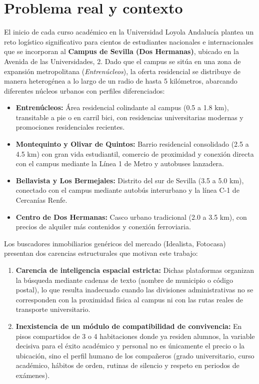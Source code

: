 \documentclass[a4paper,12pt]{article}
\begin{document}
\section{Problema real y contexto}

El inicio de cada curso académico en la Universidad Loyola Andalucía plantea un reto logístico significativo para cientos de estudiantes nacionales e internacionales que se incorporan al \textbf{Campus de Sevilla (Dos Hermanas)}, ubicado en la Avenida de las Universidades, 2. Dado que el campus se sitúa en una zona de expansión metropolitana (\textit{Entrenúcleos}), la oferta residencial se distribuye de manera heterogénea a lo largo de un radio de hasta 5 kilómetros, abarcando diferentes núcleos urbanos con perfiles diferenciados:

\begin{itemize}[leftmargin=1.0cm]
  \item \textbf{Entrenúcleos:} Área residencial colindante al campus (0.5 a 1.8 km), transitable a pie o en carril bici, con residencias universitarias modernas y promociones residenciales recientes.
  \item \textbf{Montequinto y Olivar de Quintos:} Barrio residencial consolidado (2.5 a 4.5 km) con gran vida estudiantil, comercio de proximidad y conexión directa con el campus mediante la Línea 1 de Metro y autobuses lanzadera.
  \item \textbf{Bellavista y Los Bermejales:} Distrito del sur de Sevilla (3.5 a 5.0 km), conectado con el campus mediante autobús interurbano y la línea C-1 de Cercanías Renfe.
  \item \textbf{Centro de Dos Hermanas:} Casco urbano tradicional (2.0 a 3.5 km), con precios de alquiler más contenidos y conexión ferroviaria.
\end{itemize}

Los buscadores inmobiliarios genéricos del mercado (Idealista, Fotocasa) presentan dos carencias estructurales que motivan este trabajo:
\begin{enumerate}[leftmargin=1.0cm]
  \item \textbf{Carencia de inteligencia espacial estricta:} Dichas plataformas organizan la búsqueda mediante cadenas de texto (nombre de municipio o código postal), lo que resulta inadecuado cuando las divisiones administrativas no se corresponden con la proximidad física al campus ni con las rutas reales de transporte universitario.
  \item \textbf{Inexistencia de un módulo de compatibilidad de convivencia:} En pisos compartidos de 3 o 4 habitaciones donde ya residen alumnos, la variable decisiva para el éxito académico y personal no es únicamente el precio o la ubicación, sino el perfil humano de los compañeros (grado universitario, curso académico, hábitos de orden, rutinas de silencio y respeto en periodos de exámenes).
\end{enumerate}
\end{document}
